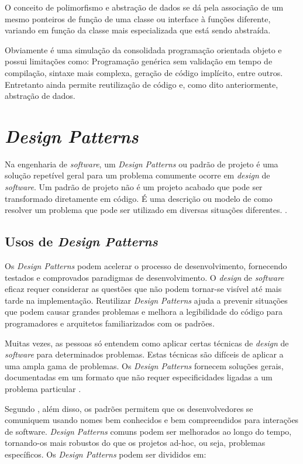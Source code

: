 O conceito de polimorfismo e abstração de dados se dá pela associação de um mesmo ponteiros de função de uma classe ou interface à funções diferente, variando em função da classe mais especializada que está sendo abstraída.

Obviamente é uma simulação da consolidada programação orientada objeto e possui limitações como: Programação genérica sem validação em tempo de compilação, sintaxe mais complexa, geração de código implícito, entre outros. Entretanto ainda permite reutilização de código e, como dito anteriormente, abstração de dados.

\section{\emph{Design Patterns}}
Na engenharia de \emph{software}, um \emph{Design Patterns} ou padrão de projeto é uma solução repetível geral para um problema comumente ocorre em \emph{design} de \emph{software}. Um padrão de projeto não é um projeto acabado que pode ser transformado diretamente em código. É uma descrição ou modelo de como resolver um problema que pode ser utilizado em diversas situações diferentes. \cite{shalloway2004design}.

\subsection{Usos de \emph{Design Patterns}}

Os \emph{Design Patterns} podem acelerar o processo de desenvolvimento, fornecendo testados e comprovados paradigmas de desenvolvimento. O \emph{design} de \emph{software} eficaz requer considerar as questões que não podem tornar-se visível até mais tarde na implementação. Reutilizar \emph{Design Patterns} ajuda a prevenir situações que podem causar grandes problemas e melhora a legibilidade do código para programadores e arquitetos familiarizados com os padrões.

Muitas vezes, as pessoas só entendem como aplicar certas técnicas de \emph{design} de \emph{software} para determinados problemas. Estas técnicas são difíceis de aplicar a uma ampla gama de problemas. Os \emph{Design Patterns} fornecem soluções gerais, documentadas em um formato que não requer especificidades ligadas a um problema particular \cite{shalloway2004design}.

Segundo \cite{shalloway2004design}, além disso, os padrões permitem que os desenvolvedores se comuniquem usando nomes bem conhecidos e bem compreendidos para interações de software. \emph{Design Patterns} comuns podem ser melhorados ao longo do tempo, tornando-os mais robustos do que os projetos ad-hoc, ou seja, problemas específicos. Os \emph{Design Patterns} podem ser divididos em:

